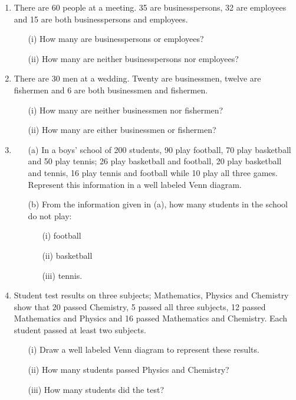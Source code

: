 \begin{enumerate}
	\item There are 60 people at a meeting. 35 are businesspersons, 32 are employees and 15 are both businesspersons and employees.
	\begin{itemize}
	\item[(i)] How many are businesspersons or employees?
	\item[(ii)] How many are neither businesspersons nor employees?
	\end{itemize}
	
	\item There are 30 men at a wedding. Twenty are businessmen, twelve are fishermen and 6 are both businessmen and fishermen.
	\begin{itemize}
	\item[(i)] How many are neither businessmen nor fishermen?
	\item[(ii)] How many are either businessmen or fishermen?
	\end{itemize}
	
	\item 
	\begin{itemize}
	\item[(a)] In a boys' school of 200 students, 90 play football, 70 play basketball and 50 play tennis; 26 play basketball and football, 20 play basketball and tennis, 16 play tennis and football while 10 play all three games. Represent this information in a well labeled Venn diagram.
	\item[(b)] From the information given in (a), how many students in the school do not play:
	\begin{itemize}
	\item[(i)] football
	\item[(ii)] basketball
	\item[(iii)] tennis.
	\end{itemize}
	\end{itemize}
	
	\item Student test results on three subjects; Mathematics, Physics and Chemistry show that 20 passed Chemistry, 5 passed all three subjects, 12 passed Mathematics and Physics and 16 passed Mathematics and Chemistry. Each student passed at least two subjects.
	\begin{itemize}
	\item[(i)] Draw a well labeled Venn diagram to represent these results.
	\item[(ii)] How many students passed Physics and Chemistry?
	\item[(iii)] How many students did the test?
	\end{itemize}


\end{enumerate}
